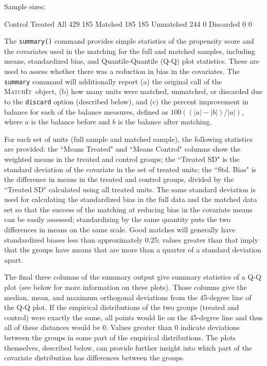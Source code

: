 \documentclass[oneside,letterpaper,titlepage]{article}
\newcommand{\MatchIt}{\textsc{MatchIt}}
\begin{document}
\begin{enumerate}
\begin{Schunk}
\begin{Soutput}
Sample sizes:

          Control Treated
All           429     185
Matched       185     185
Unmatched     244       0
Discarded       0       0
\end{Soutput}
\end{Schunk}

The \texttt{summary()} command provides simple statistics of the propensity score and the
covariates used in the matching for the full and
matched samples, including means, standardized bias, and Quantile-Quantile (Q-Q) plot statistics.  These are used
to assess whether there was a reduction in bias in the covariates.
The \texttt{summary} command will additionally report (a) the original
call of the \MatchIt\ object, (b) how many units were matched, unmatched, or discarded due
to the \texttt{discard} option (described below), and (c) the percent
improvement in balance for each of the balance measures, defined as $100((|a|-|b|)/|a|)$, where $a$ is the balance
before and $b$ is the balance after matching.  

For each set of units (full sample and matched sample), the following statistics are provided: the ``Means Treated" 
and ``Means Control" columns show the weighted
means in the treated and control groups;  the ``Treated SD" is the standard deviation of the covariate in the set
of treated units; the ``Std. Bias" is the difference in means in the treated and control groups, divided by the 
``Treated SD" calculated using all treated units.  The same standard deviation is used for calculating the standardized bias 
in the full data and the matched data set so that the success of the matching at reducing bias in the covariate means can be 
easily assessed; standardizing
by the same quantity puts the two differences in means on the same scale.  
Good matches will generally have standardized biases less than approximately 0.25; values greater than that imply that the
groups have means that are more than a quarter of a standard deviation apart.   

The final three columns of the summary output give summary statistics of a Q-Q plot (see below for more information on these 
plots). Those columns give the median, mean, and maximum orthogonal deviations from the 45-degree line of the Q-Q plot.  If 
the empirical distributions of the two groups (treated and control) were exactly the same, all points would lie on the 
45-degree line and thus all of these distances would be 0.  Values greater than 0 indicate deviations between the groups in 
some part of the empirical distributions.  The plots themselves, described below, can provide further insight into which 
part of the covariate distribution has differences between the groups.


\end{enumerate}
\end{document}
